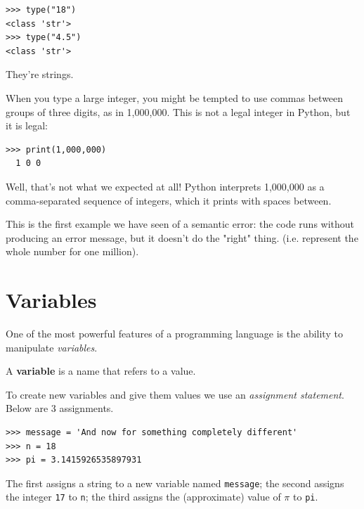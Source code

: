 \begin{Verbatim}[frame=single]
>>> type("18")
<class 'str'>
>>> type("4.5")
<class 'str'>
\end{Verbatim}

They're strings.

When you type a large integer, you might be tempted to use commas between groups of three digits, as in 1,000,000. This is not a legal integer in Python, but it is legal:

\begin{Verbatim}[frame=single]
>>> print(1,000,000)
  1 0 0
\end{Verbatim}

Well, that's not what we expected at all! Python interprets 1,000,000 as a comma-separated sequence of integers, which it prints with spaces between.

 

This is the first example we have seen of a semantic error: the code runs without producing an error message, but it doesn't do the "right" thing. (i.e. represent the whole number for one million).

\hypertarget{variables}{%
\section{Variables}\label{variables}}

 

One of the most powerful features of a programming language is the ability to manipulate \emph{variables}. 

\begin{definition}
A \textbf{variable} is a name that refers to a value.
\end{definition}

To create new variables and give them
values we use an \emph{assignment statement}. Below are 3 assignments.

\begin{Verbatim}[frame=single]
>>> message = 'And now for something completely different'
>>> n = 18
>>> pi = 3.1415926535897931
\end{Verbatim}

The first assigns a string to a new variable named \texttt{message}; the second assigns the integer
\texttt{17} to \texttt{n}; the third assigns the (approximate) value of \(\pi\) to \texttt{pi}.

